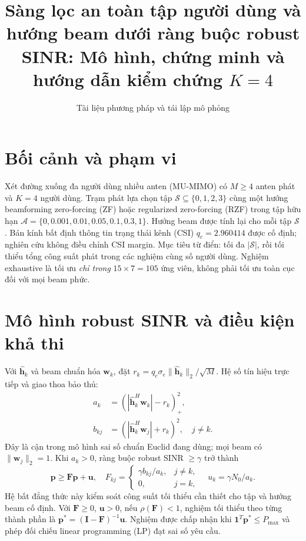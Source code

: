\documentclass[12pt,onecolumn]{IEEEtran}
\title{Sàng lọc an toàn tập người dùng và hướng beam dưới ràng buộc robust SINR: Mô hình, chứng minh và hướng dẫn kiểm chứng $K=4$}
\author{Tài liệu phương pháp và tái lập mô phỏng}
\begin{document}
\maketitle
\section{Bối cảnh và phạm vi}
Xét đường xuống đa người dùng nhiều anten (MU-MIMO) có $M\ge4$ anten phát và $K=4$ người dùng. Trạm phát lựa chọn tập $\mathcal S\subseteq\{0,1,2,3\}$ cùng một hướng beamforming zero-forcing (ZF) hoặc regularized zero-forcing (RZF) trong tập hữu hạn $\mathcal A=\{0,0.001,0.01,0.05,0.1,0.3,1\}$. Hướng beam được tính lại cho mỗi tập $\mathcal S$. Bán kính bất định thông tin trạng thái kênh (CSI) $q_c=2.960414$ được cố định; nghiên cứu không điều chỉnh CSI margin.
Mục tiêu từ điển: tối đa $|\mathcal S|$, rồi tối thiểu tổng công suất phát trong các nghiệm cùng số người dùng. Nghiệm exhaustive là tối ưu \emph{chỉ trong} $15\times7=105$ ứng viên, không phải tối ưu toàn cục đối với mọi beam phức.
\section{Mô hình robust SINR và điều kiện khả thi}
Với $\widehat{\mathbf h}_k$ và beam chuẩn hóa $\mathbf w_k$, đặt $r_k=q_c\sigma_e\|\widehat{\mathbf h}_k\|_2/\sqrt M$. Hệ số tín hiệu trực tiếp và giao thoa bảo thủ:
\begin{align}
 a_k&=(|\widehat{\mathbf h}_k^H\mathbf w_k|-r_k)_+^2,\\
 b_{kj}&=(|\widehat{\mathbf h}_k^H\mathbf w_j|+r_k)^2,\quad j\ne k.
\end{align}
Đây là cận trong mô hình sai số chuẩn Euclid đang dùng; mọi beam có $\|\mathbf w_j\|_2=1$. Khi $a_k>0$, ràng buộc robust SINR $\ge\gamma$ trở thành
\begin{equation}
 \mathbf p\ge \mathbf F\mathbf p+\mathbf u,\quad F_{kj}=\begin{cases}\gamma b_{kj}/a_k,&j\ne k,\\0,&j=k,\end{cases}\quad u_k=\gamma N_0/a_k.
\end{equation}
Hệ bất đẳng thức này kiểm soát công suất tối thiểu cần thiết cho tập và hướng beam cố định. Với $\mathbf F\ge0$, $\mathbf u>0$, nếu $\rho(\mathbf F)<1$, nghiệm tối thiểu theo từng thành phần là $\mathbf p^*=(\mathbf I-\mathbf F)^{-1}\mathbf u$. Nghiệm được chấp nhận khi $\mathbf 1^T\mathbf p^*\le P_{\max}$ và phép đối chiếu linear programming (LP) đạt sai số yêu cầu.
\end{document}
